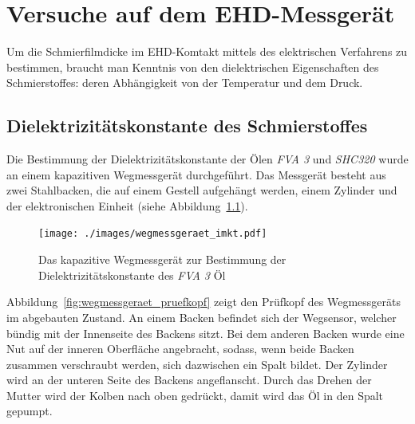 \chapter{Versuche auf dem EHD-Messgerät}
\label{chap:versuche_auf_dem_ehd_messgeraet}

Um die Schmierfilmdicke im EHD-Komtakt mittels des elektrischen Verfahrens zu bestimmen, braucht man Kenntnis von den dielektrischen Eigenschaften des Schmierstoffes: deren Abhängigkeit von der Temperatur und dem Druck.

\section{Dielektrizitätskonstante des Schmierstoffes}
\label{sec:dielektrizitaetskonstate_des_schmierstoffes}

Die Bestimmung der Dielektrizitätskonstante der Ölen \textit{FVA 3} und \textit{SHC320} wurde an einem kapazitiven Wegmessgerät durchgeführt.
Das Messgerät besteht aus zwei Stahlbacken, die auf einem Gestell aufgehängt werden, einem Zylinder und der elektronischen Einheit (siehe Abbildung~\ref{fig:das_kapazitive_wegmessgeraet}).

\begin{figure}[htb]
    \centering
    \texttt{[image: ./images/wegmessgeraet\_imkt.pdf]}
    \caption{Das kapazitive Wegmessgerät zur Bestimmung der Dielektrizitätskonstante des \textit{FVA 3} Öl}
    \label{fig:das_kapazitive_wegmessgeraet}
\end{figure}

Abbildung~\ref{fig:wegmessgeraet_pruefkopf} zeigt den Prüfkopf des Wegmessgeräts im abgebauten Zustand.
An einem Backen befindet sich der Wegsensor, welcher bündig mit der Innenseite des Backens sitzt.
Bei dem anderen Backen wurde eine Nut auf der inneren Oberfläche angebracht, sodass, wenn beide Backen zusammen verschraubt werden, sich dazwischen ein Spalt bildet.
Der Zylinder wird an der unteren Seite des Backens angeflanscht.
Durch das Drehen der Mutter wird der Kolben nach oben gedrückt, damit wird das Öl in den Spalt gepumpt.


